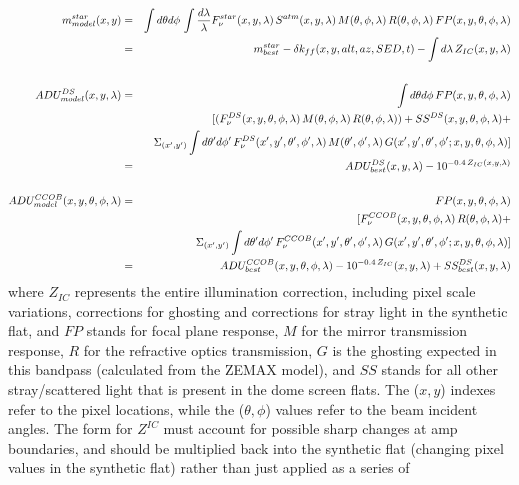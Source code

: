 \documentclass[12pt,preprint]{aastex}
\begin{document}
\begin{eqnarray}
m^{star}_{model}(x,y) & = &  \int d\theta d\phi \, \int {d\lambda \over \lambda}
F_\nu^{star}(x,y,\lambda)\,S^{atm}(x,y,\lambda)\,M(\theta,\phi,\lambda)\,R(\theta,\phi,\lambda)\,FP(x,y,\theta,\phi,\lambda)
\nonumber \\
 & = & m^{star}_{best} - \delta k_{ff}(x,y,alt,az,SED,t) - \int d\lambda \, Z_{IC}(x,y,\lambda)\\
\nonumber \\
ADU^{DS}_{model}(x,y,\lambda) & = & \int d\theta d\phi \,
FP(x,y,\theta,\phi,\lambda)   \nonumber \\
& & [(F_\nu^{DS}(x,y,\theta,\phi,\lambda)\,M(\theta,\phi,\lambda)\,R(\theta,\phi,\lambda))
+ SS^{DS}(x,y,\theta,\phi,\lambda) +  \nonumber \\ 
& & \Sigma_{(x',y')} \int d\theta' d\phi' \,F_\nu^{DS}(x',y',\theta',
\phi',\lambda)\,M(\theta',\phi',\lambda)\,G(x',y',\theta',\phi';
x,y,\theta,\phi,\lambda)] \nonumber  \\
 & = & ADU^{DS}_{best}(x,y,\lambda) - 10^{-0.4 \,
   Z_{IC}(x,y,\lambda)} \\
\nonumber \\
ADU^{CCOB}_{model}(x,y,\theta,\phi,\lambda) & = &  FP(x,y,\theta,\phi,\lambda) \nonumber \\
& & [ F_\nu^{CCOB}(x,y,\theta,\phi,\lambda)\,R(\theta,\phi,\lambda) +
\nonumber \\
&& \Sigma_{(x',y')} \int d\theta' d\phi'
\,F_\nu^{CCOB}(x',y',\theta',\phi',\lambda)\,G(x',y',\theta',\phi';x,y,\theta,\phi,\lambda)]
\nonumber \\
& = & ADU^{CCOB}_{best}(x,y,\theta,\phi,\lambda) -
10^{-0.4\,Z_{IC}}(x,y,\lambda) + SS^{DS}_{best}(x,y,\lambda) 
\end{eqnarray} 
where $Z_{IC}$ represents the entire illumination correction,
including pixel scale variations, corrections for ghosting and
corrections for stray light in the synthetic flat, and $FP$ stands for
focal plane response, $M$ for the mirror transmission response, $R$ for the
refractive optics transmission, $G$ is the ghosting expected in this bandpass (calculated from
the ZEMAX model), and $SS$ stands for all other stray/scattered light
that is present in the dome screen flats. The ($x,y$) indexes refer to
the pixel locations, while the ($\theta,\phi$) values refer to the
beam incident angles. The form for
$Z^{IC}$ must account for possible sharp changes at amp boundaries,
and should be multiplied back into the synthetic flat (changing pixel
values in the synthetic flat) rather than just applied as a series of
\end{document}
